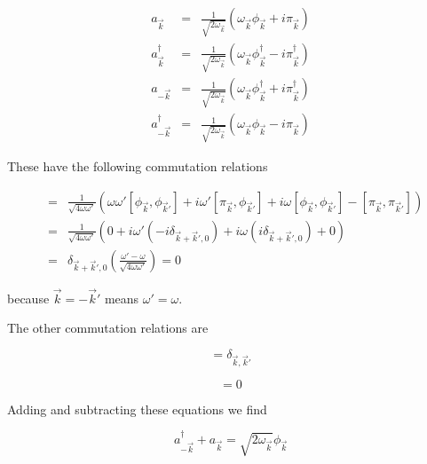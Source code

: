 \documentclass[aps,showpacs,onecolumn,floats,prd,superscriptaddress,nofootinbib]{revtex4-1}
\begin{document}
\begin{eqnarray}
	a_{\vec{k}} & = & \frac{1}{\sqrt{2 \omega_{\vec{k}}}} \left( \omega_{\vec{k}} \phi_{\vec{k}} + i \pi_{\vec{k}} \right) \nonumber	\\
	a^\dagger_{\vec{k}} & = & \frac{1}{\sqrt{2 \omega_{\vec{k}}}} \left( \omega_{\vec{k}} \phi^\dagger_{\vec{k}} - i \pi^\dagger_{\vec{k}} \right)	\nonumber	\\
	a_{- \vec{k}} & = & \frac{1}{\sqrt{2 \omega_{\vec{k}}}} \left( \omega_{\vec{k}} \phi^\dagger_{\vec{k}} + i \pi^\dagger_{\vec{k}} \right)	\nonumber	\\
	a^\dagger_{- \vec{k}} & = & \frac{1}{\sqrt{2 \omega_{\vec{k}}}} \left( \omega_{\vec{k}} \phi_{\vec{k}} - i \pi_{\vec{k}} \right)
\end{eqnarray}

These have the following commutation relations

\begin{eqnarray}
	[a_{\vec{k}}, a_{\vec{k}'}] & = & \frac{1}{\sqrt{4 \omega \omega'}} \left( \omega \omega' [\phi_{\vec{k}}, \phi_{\vec{k}'}] + i \omega' [\pi_{\vec{k}}, \phi_{\vec{k}'}] + i \omega[\phi_{\vec{k}}, \phi_{\vec{k}'}] - [\pi_{\vec{k}}, \pi_{\vec{k}'}] \right)	\nonumber	\\
	& = & \frac{1}{\sqrt{4 \omega \omega'}} (0 + i \omega' (- i \delta_{\vec{k} + \vec{k}',0}) + i\omega(i \delta_{\vec{k} + \vec{k}',0}) + 0)	\nonumber	\\
	& = & \delta_{\vec{k} + \vec{k}',0} \left( \frac{\omega' - \omega}{\sqrt{4 \omega \omega'}} \right)	= 0
\end{eqnarray}

because $\vec{k} = - \vec{k}'$ means $\omega' = \omega$. 

The other commutation relations are

\begin{equation}
	[a_{\vec{k}}, a^\dagger_{\vec{k}'}] = \delta_{\vec{k}, \vec{k}'}
\end{equation}

\begin{equation}
	[a^\dagger_{\vec{k}}, a^\dagger_{\vec{k}'}] = 0
\end{equation}

Adding and subtracting these equations we find

\begin{equation}
	a^\dagger_{- \vec{k}} + a_{\vec{k}} = \sqrt{2 \omega_{\vec{k}}} \phi_{\vec{k}}
\end{equation}
\end{document}
